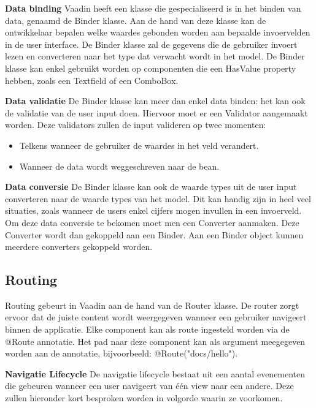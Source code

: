 \textbf{Data binding} \hspace{1cm} Vaadin heeft een klasse die gespecialiseerd is in het binden van data, genaamd de Binder klasse. Aan de hand van deze klasse kan de ontwikkelaar bepalen welke waardes gebonden worden aan bepaalde invoervelden in de user interface. De Binder klasse zal de gegevens die de gebruiker invoert lezen en converteren naar het type dat verwacht wordt in het model. De Binder klasse kan enkel gebruikt worden op componenten die een HasValue property hebben, zoals een Textfield of een ComboBox. 

\textbf{Data validatie} \hspace{1cm} De Binder klasse kan meer dan enkel data binden: het kan ook de validatie van de user input doen. Hiervoor moet er een Validator aangemaakt worden. Deze validators zullen de input valideren op twee momenten: 
\begin{itemize}
	\item Telkens wanneer de gebruiker de waardes in het veld verandert.
	\item Wanneer de data wordt weggeschreven naar de bean. 
\end{itemize}

\textbf{Data conversie} \hspace{1cm} De Binder klasse kan ook de waarde types uit de user input converteren naar de waarde types van het model. Dit kan handig zijn in heel veel situaties, zoals wanneer de users enkel cijfers mogen invullen in een invoerveld.
Om deze data conversie te bekomen moet men een Converter aanmaken. Deze Converter wordt dan gekoppeld aan een Binder. Aan een Binder object kunnen meerdere converters gekoppeld worden. 

\subsection{Routing}
Routing gebeurt in Vaadin aan de hand van de Router klasse. De router zorgt ervoor dat de juiste content wordt weergegeven wanneer een gebruiker navigeert binnen de applicatie. Elke component kan als route ingesteld worden via de @Route annotatie. 
Het pad naar deze component kan als argument meegegeven worden aan de annotatie, bijvoorbeeld: @Route("docs/hello").

\textbf{Navigatie Lifecycle} \hspace{1cm} De navigatie lifecycle bestaat uit een aantal evenementen die gebeuren wanneer een user navigeert van één view naar een andere. Deze zullen hieronder kort besproken worden in volgorde waarin ze voorkomen. 

